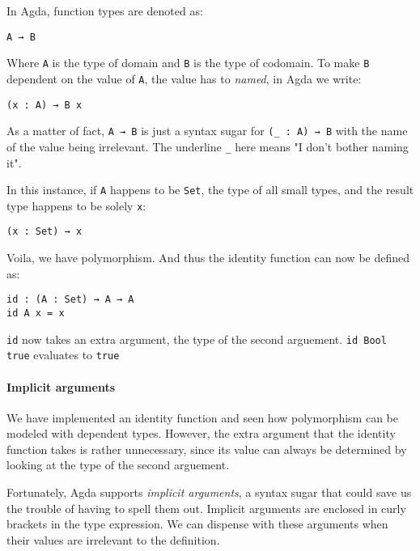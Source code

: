\documentclass[12pt, a4paper]{article}
\begin{document}
In Agda, function types are denoted as:

\begin{lstlisting}
A → B
\end{lstlisting}

Where {\lstinline|A|} is the type of domain and {\lstinline|B|} is the type of
codomain. To make {\lstinline|B|} dependent on the value of {\lstinline|A|}, the
value has to \textit{named}, in Agda we write:

\begin{lstlisting}
(x : A) → B x
\end{lstlisting}

As a matter of fact, {\lstinline|A → B|} is just a syntax sugar for {\lstinline|(_ : A) → B|}
with the name of the value being irrelevant. The underline {\lstinline|_|} here
means "I don't bother naming it".

In this instance, if {\lstinline|A|} happens to be {\lstinline|Set|}, the type
of all small types, and the result type happens to be solely {\lstinline|x|}:

\begin{lstlisting}
(x : Set) → x
\end{lstlisting}

Voila, we have polymorphism. And thus the identity function can now be defined as:

\begin{lstlisting}
id : (A : Set) → A → A
id A x = x
\end{lstlisting}

{\lstinline|id|} now takes an extra argument, the type of the second arguement.
{\lstinline|id Bool true|} evaluates to {\lstinline|true|}

\paragraph{Implicit arguments}

We have implemented an identity function and seen how polymorphism can be modeled
with dependent types. However, the extra argument that the identity function
takes is rather unnecessary, since its value can always be determined by looking
at the type of the second arguement.

Fortunately, Agda supports \textit{implicit arguments}, a syntax sugar that could
save us the trouble of having to spell them out. Implicit arguments are enclosed
in curly brackets in the type expression. We can dispense with these arguments
when their values are irrelevant to the definition.
\end{document}
